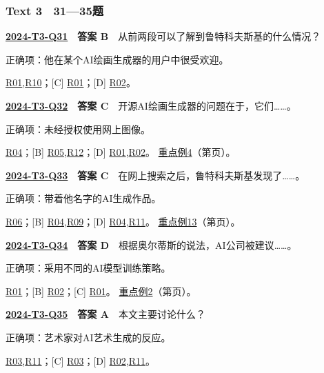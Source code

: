 \documentclass[11pt,a4paper]{article}
\begin{document}
\subsubsection{Text 3　31—35题}
\label{idx-2024-T3-Q31}
\noindent\textbf{\href{https://zj139.github.io/math-notes/english/45e4c8a550f2be01daf2d7ac/\#q31}{2024-T3-Q31}　答案 B}　从前两段可以了解到鲁特科夫斯基的什么情况？\par\nopagebreak
\noindent 正确项：他在某个AI绘画生成器的用户中很受欢迎。\par\nopagebreak
\noindent [A] \hyperref[cat-R01]{R01},\hyperref[cat-R10]{R10}；[C] \hyperref[cat-R01]{R01}；[D] \hyperref[cat-R02]{R02}。
\par\smallskip
{}\label{idx-2024-T3-Q32}
\noindent\textbf{\href{https://zj139.github.io/math-notes/english/45e4c8a550f2be01daf2d7ac/\#q32}{2024-T3-Q32}　答案 C}　开源AI绘画生成器的问题在于，它们……。\par\nopagebreak
\noindent 正确项：未经授权使用网上图像。\par\nopagebreak
\noindent [A] \hyperref[cat-R04]{R04}；[B] \hyperref[cat-R05]{R05},\hyperref[cat-R12]{R12}；[D] \hyperref[cat-R01]{R01},\hyperref[cat-R02]{R02}。
\hyperref[case-2024-T3-Q32]{重点例4}（第\pageref{case-2024-T3-Q32}页）。
\par\smallskip
{}\label{idx-2024-T3-Q33}
\noindent\textbf{\href{https://zj139.github.io/math-notes/english/45e4c8a550f2be01daf2d7ac/\#q33}{2024-T3-Q33}　答案 C}　在网上搜索之后，鲁特科夫斯基发现了……。\par\nopagebreak
\noindent 正确项：带着他名字的AI生成作品。\par\nopagebreak
\noindent [A] \hyperref[cat-R06]{R06}；[B] \hyperref[cat-R04]{R04},\hyperref[cat-R09]{R09}；[D] \hyperref[cat-R04]{R04},\hyperref[cat-R11]{R11}。
\hyperref[case-2024-T3-Q33]{重点例13}（第\pageref{case-2024-T3-Q33}页）。
\par\smallskip
{}\label{idx-2024-T3-Q34}
\noindent\textbf{\href{https://zj139.github.io/math-notes/english/45e4c8a550f2be01daf2d7ac/\#q34}{2024-T3-Q34}　答案 D}　根据奥尔蒂斯的说法，AI公司被建议……。\par\nopagebreak
\noindent 正确项：采用不同的AI模型训练策略。\par\nopagebreak
\noindent [A] \hyperref[cat-R01]{R01}；[B] \hyperref[cat-R02]{R02}；[C] \hyperref[cat-R01]{R01}。
\hyperref[case-2024-T3-Q34]{重点例2}（第\pageref{case-2024-T3-Q34}页）。
\par\smallskip
{}\label{idx-2024-T3-Q35}
\noindent\textbf{\href{https://zj139.github.io/math-notes/english/45e4c8a550f2be01daf2d7ac/\#q35}{2024-T3-Q35}　答案 A}　本文主要讨论什么？\par\nopagebreak
\noindent 正确项：艺术家对AI艺术生成的反应。\par\nopagebreak
\noindent [B] \hyperref[cat-R03]{R03},\hyperref[cat-R11]{R11}；[C] \hyperref[cat-R03]{R03}；[D] \hyperref[cat-R02]{R02},\hyperref[cat-R11]{R11}。
\par\smallskip
\end{document}
